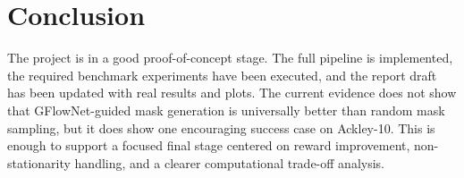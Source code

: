 \documentclass{article}
\begin{document}
\section{Conclusion}

The project is in a good proof-of-concept stage. The full pipeline is implemented, the required benchmark experiments have been executed, and the report draft has been updated with real results and plots. The current evidence does not show that GFlowNet-guided mask generation is universally better than random mask sampling, but it does show one encouraging success case on Ackley-10. This is enough to support a focused final stage centered on reward improvement, non-stationarity handling, and a clearer computational trade-off analysis.



\end{document}
